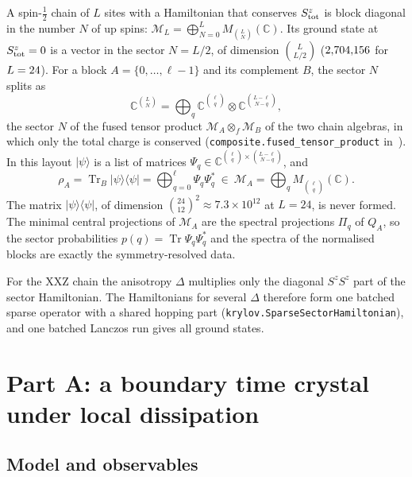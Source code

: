 \documentclass[11pt]{article}
\DeclareMathOperator{\Tr}{Tr}
\newcommand{\C}{\mathbb{C}}
\newcommand{\M}{\mathcal{M}}
\newcommand{\code}[1]{\nolinkurl{#1}}
\begin{document}
A spin-$\frac12$ chain of $L$ sites with a Hamiltonian that conserves $S^z_{\rm tot}$ is block diagonal in the number
$N$ of up spins: $\M_L=\bigoplus_{N=0}^LM_{\binom LN}(\C)$. Its ground state at $S^z_{\rm tot}=0$ is a vector in the
sector $N=L/2$, of dimension $\binom{L}{L/2}$ ($2{,}704{,}156$ for $L=24$). For a block $A=\{0,\dots,\ell-1\}$ and its
complement $B$, the sector $N$ splits as
\begin{equation}\label{eq:fused}
  \C^{\binom LN}=\bigoplus_{q}\C^{\binom\ell q}\otimes\C^{\binom{L-\ell}{N-q}},
\end{equation}
the sector $N$ of the fused tensor product $\M_A\otimes_f\M_B$ of the two chain algebras, in which only the total
charge is conserved (\code{composite.fused_tensor_product} in~\cite{lib}). In this layout $|\psi\rangle$ is a list of
matrices $\Psi_q\in\C^{\binom\ell q\times\binom{L-\ell}{N-q}}$, and
\begin{equation}\label{eq:rhoA}
  \rho_A=\Tr_B|\psi\rangle\langle\psi|=\bigoplus_{q=0}^{\ell}\Psi_q\Psi_q^*\ \in\ \M_A=\bigoplus_qM_{\binom\ell q}(\C).
\end{equation}
The matrix $|\psi\rangle\langle\psi|$, of dimension $\binom{24}{12}^2\approx7.3\times10^{12}$ at $L=24$, is never formed.
The minimal central projections of $\M_A$ are the spectral projections $\Pi_q$ of $Q_A$, so the sector probabilities
$p(q)=\Tr\Psi_q\Psi_q^*$ and the spectra of the normalised blocks are exactly the symmetry-resolved data.

For the XXZ chain the anisotropy $\Delta$ multiplies only the diagonal $S^zS^z$ part of the sector Hamiltonian. The
Hamiltonians for several $\Delta$ therefore form one batched sparse operator with a shared hopping part
(\code{krylov.SparseSectorHamiltonian}), and one batched Lanczos run gives all ground states.

\section{Part A: a boundary time crystal under local dissipation}\label{sec:btc}

\subsection{Model and observables}\label{sec:btc-model}
\end{document}
